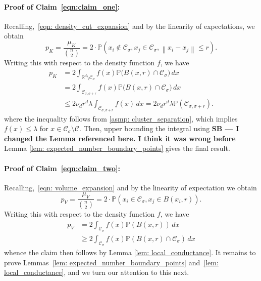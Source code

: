 \documentclass[11pt,twoside]{article}
\newcommand{\Reals}{\mathbb{R}}
\newcommand{\Rd}{\Reals^d}
\newcommand{\norm}[1]{\left\lVert#1\right\rVert}
\newcommand{\1}{\mathbf{1}}
\newcommand{\Pbb}{\mathbb{P}}
\newcommand{\Cset}{\mathcal{C}}
\newcommand{\Csig}{\Cset_{\sigma}}
\newcommand{\Csigr}{\Cset_{\sigma,\sigma + r}}
\newcommand{\dx}{\,dx}
\newcommand{\sbcomment}[1]{{\color{red} \bf{{{{SB --- #1}}}}}}
\begin{document}
\paragraph{Proof of Claim~\eqref{eqn:claim_one}: } Recalling,~\eqref{eqn: density_cut_expansion} 
	and by the linearity of expectations, we obtain
	\begin{equation*}
	p_K = \frac{\mu_K}{{n \choose 2}} = 2 \cdot \Pbb(x_i \not\in \Csig, x_j \in \Csig, \norm{x_i - x_j} \leq r). \tag{for each $i,j$, $i \neq j$}
	\end{equation*}
	Writing this with respect to the density function $f$, we have
	\begin{align*}
	p_K & = 2 \int_{\Rd \setminus \Csig} f(x) \Pbb\bigl(B(x,r) \cap \Csig\bigr) \dx \\
	& = 2 \int_{\Csigr} f(x) \Pbb\bigl(B(x,r) \cap \Csig\bigr) \dx \\
	& \leq 2 \nu_d r^d \lambda  \int_{\Csigr} f(x) \dx = 2 \nu_d r^d \lambda \Pbb(\Csigr).
	\end{align*}
	where the inequality follows from \ref{asmp: cluster_separation}, which implies $f(x) \leq \lambda$ for $x \in \Csig \setminus \Cset$. Then, upper bounding the integral using \sbcomment{I changed the Lemma referenced here. I think it was wrong before} Lemma \ref{lem: expected_number_boundary_points} gives the final result.


\paragraph{Proof of Claim~\eqref{eqn:claim_two}: } Recalling,~\eqref{eqn: volume_expansion}
	and by the linearity of expectation we obtain
	\begin{equation*}
	p_V = \frac{\mu_V}{{n \choose 2}} = 2 \cdot \Pbb(x_i \in \Csig, x_j \in B(x_i,r)). \tag{for any $i,j$, $i \neq j$. }
	\end{equation*}
	Writing this with respect to the density function $f$, we have
	\begin{align*}
	p_V & = 2 \int_{\Csig} f(x) \Pbb(B(x,r)) \dx \\
	& \geq 2 \int_{\Csig} f(x) \Pbb(B(x,r) \cap \Csig) \dx
	\end{align*}
	whence the claim then follows by Lemma \ref{lem: local_conductance}.
It remains to prove Lemmas~\ref{lem: expected_number_boundary_points} and~\ref{lem: local_conductance}, and we turn our attention to this next.
\end{document}
